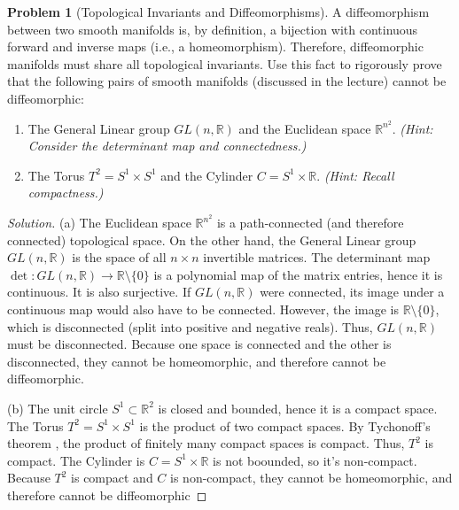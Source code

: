 \documentclass[12pt, a4paper]{article}
\theoremstyle{definition}
\newtheorem{problem}{Problem}
\newenvironment{solution}
  {\renewcommand\qedsymbol{$\blacksquare$}\begin{proof}[Solution]}
  {\end{proof}}
\newcommand{\RR}{\mathbb{R}}
\begin{document}
\begin{problem}[Topological Invariants and Diffeomorphisms]
A diffeomorphism between two smooth manifolds is, by definition, a bijection with continuous forward and inverse maps (i.e., a homeomorphism). Therefore, diffeomorphic manifolds must share all topological invariants. 
Use this fact to rigorously prove that the following pairs of smooth manifolds (discussed in the lecture) cannot be diffeomorphic:
\begin{enumerate}
    \item[(a)] The General Linear group $GL(n, \RR)$ and the Euclidean space $\RR^{n^2}$. \textit{(Hint: Consider the determinant map and connectedness.)}
    \item[(b)] The Torus $T^2 = S^1 \times S^1$ and the Cylinder $C = S^1 \times \RR$. \textit{(Hint: Recall compactness.)}
\end{enumerate}
\end{problem}
\begin{solution}
(a) The Euclidean space $\RR^{n^2}$ is a path-connected (and therefore connected) topological space. 
On the other hand, the General Linear group $GL(n, \RR)$ is the space of all $n \times n$ invertible matrices. The determinant map $\det: GL(n, \RR) \to \RR \setminus \{0\}$ is a polynomial map of the matrix entries, hence it is continuous. It is also surjective. 
If $GL(n, \RR)$ were connected, its image under a continuous map would also have to be connected. However, the image is $\RR \setminus \{0\}$, which is disconnected (split into positive and negative reals). Thus, $GL(n, \RR)$ must be disconnected. 
Because one space is connected and the other is disconnected, they cannot be homeomorphic, and therefore cannot be diffeomorphic.

(b) The unit circle $S^1 \subset \RR^2$ is closed and bounded, hence it is a compact space. 
The Torus $T^2 = S^1 \times S^1$ is the product of two compact spaces. By Tychonoff's theorem , the product of finitely many compact spaces is compact. Thus, $T^2$ is compact.
The Cylinder is $C = S^1 \times \RR$ is not boounded, so it's non-compact.
Because $T^2$ is compact and $C$ is non-compact, they cannot be homeomorphic, and therefore cannot be diffeomorphic
\end{solution}

\vfill
\end{document}
